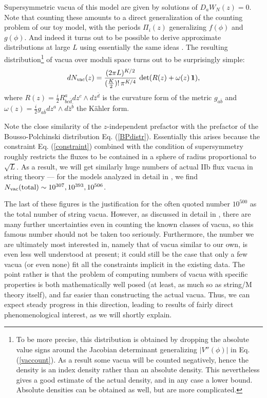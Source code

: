 \documentclass[aps,amsfonts]{ar2e}
\begin{document}
Supersymmetric vacua of this model are given by solutions of $D_a
W_N(z)=0$. Note that counting these amounts to a direct
generalization of the counting problem of our toy model, with the
periods $\Pi_i(z)$ generalizing $f(\phi)$ and $g(\phi)$. And indeed
it turns out to be possible to derive approximate distributions at
large $L$ using essentially the same ideas
\cite{Ashok:2003gk,Denef:2004ze}. The resulting
distribution\footnote{To be more precise, this distribution is
obtained by dropping the absolute value signs around the Jacobian
determinant generalizing $|V''(\phi)|$ in Eq. (\ref{vaccount}). As a
result some vacua will be counted negatively, hence the density is
an index density rather than an absolute density. This nevertheless
gives a good estimate of the actual density, and in any case a lower
bound. Absolute densities can be obtained as well, but are more
complicated.} of vacua over moduli space turns out to be
surprisingly simple:
\begin{equation} \label{adformula}
 d N_{\rm vac}(z) = \frac{(2 \pi L)^{K/2}}{(\frac{K}{2})! \,
 \pi^{K/4}}\,
 \det(R(z)+\omega(z) \, {\bf 1}),
\end{equation}
where $R(z) = \frac{i}{2} R^a_{bc\bar{d}} dz^c \wedge
d\bar{z}^{\bar{d}}$ is the curvature form of the metric $g_{a
\bar{b}}$ and $\omega(z) = \frac{i}{2} g_{a \bar{b}} dz^a \wedge d
\bar{z}^{\bar{b}}$ the K\"ahler form.

Note the close similarity of the $z$-independent prefactor with the
prefactor of the Bousso-Polchinski distribution Eq. (\ref{BPdistr}).
Essentially this arises because the constraint Eq. (\ref{constraint})
combined with the condition of supersymmetry roughly restricts the
fluxes to be contained in a sphere of radius proportional to
$\sqrt{L}$. As a result, we will get similarly huge numbers of
actual IIb flux vacua in string theory
--- for the models analyzed in detail in \cite{Denef:2004dm}, we find
$N_{\rm vac}({\rm total}) \sim 10^{307}, 10^{393},
10^{506}$.

The last of these figures is the justification for the often quoted
number $10^{500}$ as the total number of string vacua.  However, as
discussed in detail in \cite{Douglas:2006es}, there are many further
uncertainties even in counting the known classes of vacua, so this
famous number should not be taken too seriously.  Furthermore, the
number we are ultimately most interested in, namely that of vacua
similar to our own, is even less well understood at present; it could
still be the case that only a few vacua (or even none) fit all the
constraints implicit in the existing data.  The point rather is that
the problem of computing numbers of vacua with specific properties is
both mathematically well posed (at least, as much so as string/M
theory itself), and far easier than constructing the actual vacua.
Thus, we can expect steady progress in this direction, leading to
results of fairly direct phenomenological interest, as we will shortly
explain.
\end{document}
